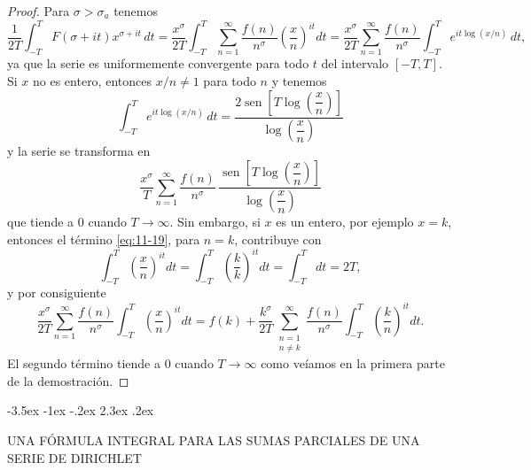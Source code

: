 \documentclass[12pt,a4paper]{book}
\makeatletter
\renewcommand\section{\@startsection{section}{1}{\z@}%
  {-3.5ex \@plus -1ex \@minus -.2ex}%
  {2.3ex \@plus .2ex}%
  {\normalfont\Large\bfseries\raggedright}}
\makeatother
\begin{document}
    \begin{proof}
        Para $\sigma>\sigma_{a}$ tenemos
        \begin{equation}\label{eq:11-19}
            \frac{1}{2T}\int_{-T}^{T}F(\sigma+it)x^{\sigma+it}\,dt=\frac{x^{\sigma}}{2T}\int_{-T}^{T}\sum_{n=1}^{\infty}\frac{f(n)}{n^{\sigma}}\left(\frac{x}{n}\right)^{it}dt
            =\frac{x^{\sigma}}{2T}\sum_{n=1}^{\infty}\frac{f(n)}{n^{\sigma}}\int_{-T}^{T}e^{it\log(x/n)}\,dt,
        \end{equation}
        ya que la serie es uniformemente convergente para todo $t$ del intervalo $[-T,T]$. Si
        $x$ no es entero, entonces $x/n\neq1$ para todo $n$ y tenemos
        \begin{equation*}
            \int_{-T}^{T}e^{it\log(x/n)}\,dt=\frac{2\operatorname{sen}\left[T\log\left(\dfrac{x}{n}\right)\right]}{\log\left(\dfrac{x}{n}\right)}
        \end{equation*}
        y la serie se transforma en
        \begin{equation*}
            \frac{x^{\sigma}}{T}\sum_{n=1}^{\infty}\frac{f(n)}{n^{\sigma}}\,\frac{\operatorname{sen}\left[T\log\left(\dfrac{x}{n}\right)\right]}{\log\left(\dfrac{x}{n}\right)}
        \end{equation*}
        que tiende a 0 cuando $T\to\infty$. Sin embargo, si $x$ es un entero, por ejemplo
        $x=k$, entonces el término \eqref{eq:11-19}, para $n=k$, contribuye con
        \begin{equation*}
            \int_{-T}^{T}\left(\frac{x}{n}\right)^{it}dt=\int_{-T}^{T}\left(\frac{k}{k}\right)^{it}dt=\int_{-T}^{T}dt=2T,
        \end{equation*}
        y por consiguiente
        \begin{equation*}
            \frac{x^{\sigma}}{2T}\sum_{n=1}^{\infty}\frac{f(n)}{n^{\sigma}}\int_{-T}^{T}\left(\frac{x}{n}\right)^{it}dt=f(k)+\frac{k^{\sigma}}{2T}\sum_{\substack{n=1\\n\neq k}}^{\infty}\frac{f(n)}{n^{\sigma}}\int_{-T}^{T}\left(\frac{k}{n}\right)^{it}dt.
        \end{equation*}
        El segundo término tiende a 0 cuando $T\to\infty$ como veíamos en la primera parte de
        la demostración.
    \end{proof}

    \section{UNA FÓRMULA INTEGRAL PARA LAS SUMAS PARCIALES DE UNA SERIE DE DIRICHLET}
\end{document}
